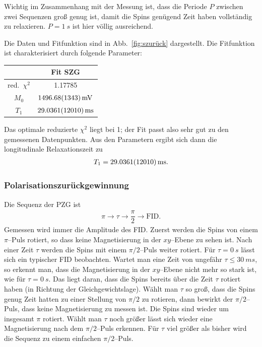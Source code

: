 \documentclass[10pt]{article}
\newenvironment{Figure}
  {\par\medskip\noindent\minipage{\linewidth}}
  {\endminipage\par\medskip}
\begin{document}
\begin{multicols}{2}
Wichtig im Zusammenhang mit der Messung ist, dass die Periode $P$ zwischen zwei Sequenzen groß genug ist, damit die Spins genügend Zeit haben vollständig zu relaxieren.
$P=\SI{1}{s}$ ist hier völlig ausreichend.
  \begin{Figure}
    \centering\resizebox{\textwidth}{!}{}
    \label{fig:szurück}
  \end{Figure}
Die Daten und Fitfunktion sind in Abb.\ \ref{fig:szurück} dargestellt.
Die Fitfunktion ist charakterisiert durch folgende Parameter:
  \begin{center}
    \begin{tabular}{c|c}
    & Fit SZG\\
    \hline
    red.\ $\chi^2$ & 1.17785\\
    $M_0$ & $\SI{1496.68+-13.43}{mV}$ \\
    $T_1$ & $\SI{29.0361+-1.201}{ms}$ 
    \end{tabular}
  \label{Tab:SZG_para}
  \end{center}
Das optimale reduzierte $\chi ^2$ liegt bei 1; der Fit passt also sehr gut zu den gemessenen Datenpunkten.
Aus den Parametern ergibt sich dann die longitudinale Relaxationszeit zu
\begin{align} 
        T_1=\SI{29.0361+-1.201}{ms}
.\end{align} 


\subsubsection{Polarisationszurückgewinnung}
Die Sequenz der PZG ist
\begin{align} 
        \pi \rightarrow \tau \rightarrow \dfrac{\pi }{2}\rightarrow \text{FID}
.\end{align} 
Gemessen wird immer die Amplitude des FID.
Zuerst werden die Spins von einem $\pi $--Puls rotiert, so dass keine Magnetisierung in der $xy$--Ebene zu sehen ist.
Nach einer Zeit $\tau $ werden die Spins mit einem $\pi /2$--Puls weiter rotiert.
Für $\tau =\SI{0}{s}$ lässt sich ein typischer FID beobachten.
Wartet man eine Zeit von ungefähr $\tau \leq \SI{30}{ms}$, so erkennt man, dass die Magnetisierung in der $xy$--Ebene nicht mehr so stark ist, wie für $\tau =\SI{0}{s}$.
Das liegt daran, dass die Spins bereits über die Zeit $\tau $ rotiert haben (in Richtung der Gleichgewichtslage).
Wählt man $\tau $ so groß, dass die Spins genug Zeit hatten zu einer Stellung von $\pi /2$ zu rotieren, dann bewirkt der $\pi /2$--Puls, dass keine Magnetisierung zu messen ist.
Die Spins sind wieder um insgesamt $\pi $ rotiert.
Wählt man $\tau $ noch größer lässt sich wieder eine Magnetisierung nach dem $\pi /2$--Puls erkennen.
Für $\tau $ viel größer als bisher wird die Sequenz zu einem einfachen $\pi /2$--Puls.


\end{multicols}
\end{document}

